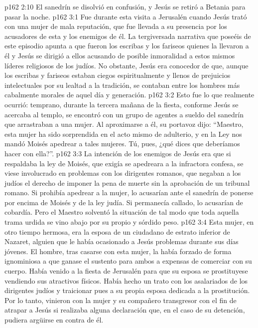 \vs p162 2:10 El sanedrín se disolvió en confusión, y Jesús se retiró a Betania para pasar la noche.
\vs p162 3:1 Fue durante esta visita a Jerusalén cuando Jesús trató con una mujer de mala reputación, que fue llevada a su presencia por los acusadores de esta y los enemigos de él. La tergiversada narrativa que poseéis de este episodio apunta a que fueron los escribas y los fariseos quienes la llevaron a él y Jesús se dirigió a ellos acusando de posible inmoralidad a estos mismos líderes religiosos de los judíos. No obstante, Jesús era conocedor de que, aunque los escribas y fariseos estaban ciegos espiritualmente y llenos de prejuicios intelectuales por su lealtad a la tradición, se contaban entre los hombres más cabalmente morales de aquel día y generación.
\vs p162 3:2 Esto fue lo que realmente ocurrió: temprano, durante la tercera mañana de la fiesta, conforme Jesús se acercaba al templo, se encontró con un grupo de agentes a sueldo del sanedrín que arrastraban a una mujer. Al aproximarse a él, su portavoz dijo: “Maestro, esta mujer ha sido sorprendida en el acto mismo de adulterio, y en la Ley nos mandó Moisés apedrear a tales mujeres. Tú, pues, ¿qué dices que deberíamos hacer con ella?”.
\vs p162 3:3 La intención de los enemigos de Jesús era que si respaldaba la ley de Moisés, que exigía se apedreara a la infractora confesa, se viese involucrado en problemas con los dirigentes romanos, que negaban a los judíos el derecho de imponer la pena de muerte sin la aprobación de un tribunal romano. Si prohibía apedrear a la mujer, lo acusarían ante el sanedrín de ponerse por encima de Moisés y de la ley judía. Si permanecía callado, lo acusarían de cobardía. Pero el Maestro solventó la situación de tal modo que toda aquella trama urdida se vino abajo por su propio y sórdido peso.
\vs p162 3:4 Esta mujer, en otro tiempo hermosa, era la esposa de un ciudadano de estrato inferior de Nazaret, alguien que le había ocasionado a Jesús problemas durante sus días jóvenes. El hombre, tras casarse con esta mujer, la había forzado de forma ignominiosa a que ganase el sustento para ambos a expensas de comerciar con su cuerpo. Había venido a la fiesta de Jerusalén para que su esposa se prostituyese vendiendo sus atractivos físicos. Había hecho un trato con los asalariados de los dirigentes judíos y traicionar pues a su propia esposa dedicada a la prostitución. Por lo tanto, vinieron con la mujer y su compañero transgresor con el fin de atrapar a Jesús si realizaba alguna declaración que, en el caso de su detención, pudiera argüirse en contra de él.
